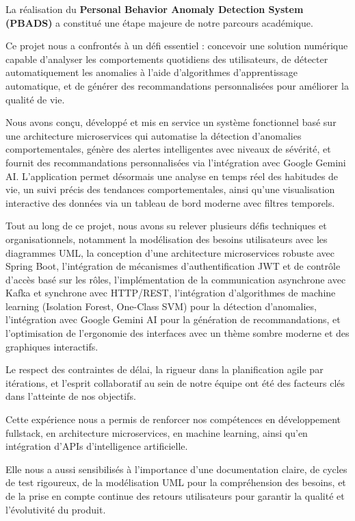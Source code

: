 La réalisation du \textbf{Personal Behavior Anomaly Detection System (PBADS)} a constitué une étape majeure de notre parcours académique.

Ce projet nous a confrontés à un défi essentiel : concevoir une solution numérique capable d'analyser les comportements quotidiens des utilisateurs, de détecter automatiquement les anomalies à l'aide d'algorithmes d'apprentissage automatique, et de générer des recommandations personnalisées pour améliorer la qualité de vie.

Nous avons conçu, développé et mis en service un système fonctionnel basé sur une architecture microservices qui automatise la détection d'anomalies comportementales, génère des alertes intelligentes avec niveaux de sévérité, et fournit des recommandations personnalisées via l'intégration avec Google Gemini AI. L'application permet désormais une analyse en temps réel des habitudes de vie, un suivi précis des tendances comportementales, ainsi qu'une visualisation interactive des données via un tableau de bord moderne avec filtres temporels.

Tout au long de ce projet, nous avons su relever plusieurs défis techniques et organisationnels, notamment la modélisation des besoins utilisateurs avec les diagrammes UML, la conception d'une architecture microservices robuste avec Spring Boot, l'intégration de mécanismes d'authentification JWT et de contrôle d'accès basé sur les rôles, l'implémentation de la communication asynchrone avec Kafka et synchrone avec HTTP/REST, l'intégration d'algorithmes de machine learning (Isolation Forest, One-Class SVM) pour la détection d'anomalies, l'intégration avec Google Gemini AI pour la génération de recommandations, et l'optimisation de l'ergonomie des interfaces avec un thème sombre moderne et des graphiques interactifs.

Le respect des contraintes de délai, la rigueur dans la planification agile par itérations, et l'esprit collaboratif au sein de notre équipe ont été des facteurs clés dans l'atteinte de nos objectifs.

Cette expérience nous a permis de renforcer nos compétences en développement fullstack, en architecture microservices, en machine learning, ainsi qu'en intégration d'APIs d'intelligence artificielle.

Elle nous a aussi sensibilisés à l'importance d'une documentation claire, de cycles de test rigoureux, de la modélisation UML pour la compréhension des besoins, et de la prise en compte continue des retours utilisateurs pour garantir la qualité et l'évolutivité du produit.

